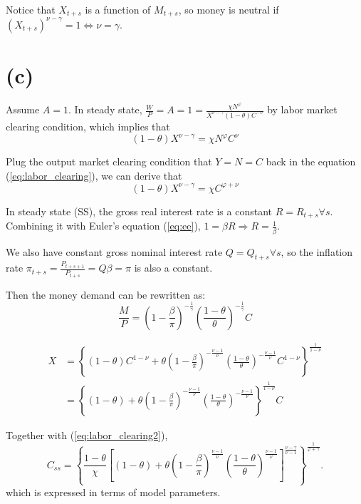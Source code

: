\documentclass[12pt]{article}
\begin{document}
Notice that $X_{t+s}$ is a function of $M_{t+s}$, so money is neutral if $(X_{t+s})^{\nu - \gamma} = 1 \iff \nu = \gamma$.

\section*{(c)}

Assume $A=1$. In steady state, $\frac{W}{P} = A = 1 = \frac{\chi N^\varphi}{X^{\nu-\gamma} (1-\theta) C^{-\nu}}$
by labor market clearing condition, which implies that 
\begin{equation}\label{eq:labor_clearing}
(1-\theta) X^{\nu - \gamma} = \chi N^\varphi C^\nu
\end{equation}


Plug the output market clearing condition that $Y = N = C$ back in the equation (\ref{eq:labor_clearing}), we can derive that
\begin{equation}\label{eq:labor_clearing2}
(1-\theta) X^{\nu - \gamma} = \chi C^{\varphi + \nu}
\end{equation}


In steady state (SS), the gross real interest rate is a constant $R = R_{t+s} \forall s$.
Combining it with Euler's equation (\ref{eq:ee}), 
$1 = \beta R \Rightarrow R = \frac{1}{\beta}$.


We also have constant gross nominal interest rate $Q = Q_{t+s} \forall s$,
so the inflation rate $\pi_{t+s} = \frac{P_{t+s+1}}{P_{t+s}} = Q\beta = \pi$ is also a constant.


Then the money demand can be rewritten as:
\begin{equation}\label{eq:md_2}
\frac{M}{P} = (1 - \frac{\beta}{\pi})^{-\frac{1}{\gamma}} \left(\frac{1-\theta}{\theta}\right)^{-\frac{1}{\gamma}} C
\end{equation}

\begin{equation}
\begin{split}
X &= \left\{(1 - \theta) C^{1-\nu} 
+ \theta \left(1 - \frac{\beta}{\pi}\right)^{-\frac{\nu-1}{\nu}} 
\left(\frac{1-\theta}{\theta}\right)^{-\frac{\nu-1}{\nu}} C^{1-\nu}\right\}^{\frac{1}{1-\nu}} \\
&= \left\{(1 - \theta) + \theta \left(1 - \frac{\beta}{\pi}\right)^{-\frac{\nu-1}{\nu}} \left(\frac{1-\theta}{\theta}\right)^{-\frac{\nu-1}{\nu}} \right\}^{\frac{1}{1-\nu}} C
\end{split}
\end{equation}


Together with (\ref{eq:labor_clearing2}),
\begin{equation}\label{eq:c_ss}
C_{ss} = \left\{\frac{1-\theta}{\chi}
\left[(1 - \theta) + \theta \left(1 - \frac{\beta}{\pi}\right)^{\frac{\nu-1}{\nu}} \left(\frac{1-\theta}{\theta}\right)^{\frac{\nu-1}{\nu}}\right]^{\frac{\nu-\gamma}{\nu-1}}\right\}^{\frac{1}{\varphi+\gamma}}.
\end{equation}
which is expressed in terms of model parameters.
\end{document}
